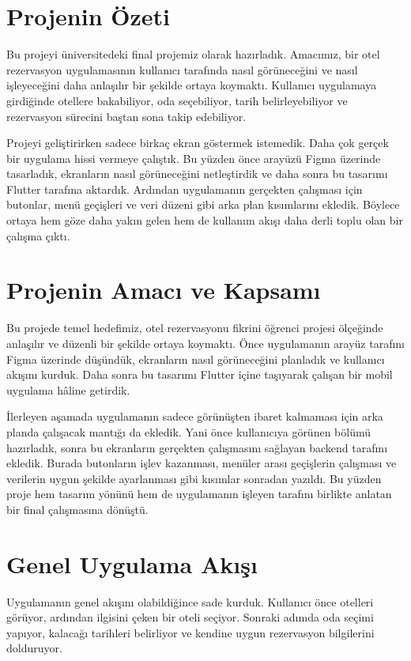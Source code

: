 \documentclass[11pt,a4paper]{article}
\begin{document}
\sloppy
\tableofcontents
\clearpage
\section{Projenin Özeti}
Bu projeyi üniversitedeki final projemiz olarak hazırladık. Amacımız, bir otel rezervasyon uygulamasının kullanıcı tarafında nasıl görüneceğini ve nasıl işleyeceğini daha anlaşılır bir şekilde ortaya koymaktı. Kullanıcı uygulamaya girdiğinde otellere bakabiliyor, oda seçebiliyor, tarih belirleyebiliyor ve rezervasyon sürecini baştan sona takip edebiliyor.

Projeyi geliştirirken sadece birkaç ekran göstermek istemedik. Daha çok gerçek bir uygulama hissi vermeye çalıştık. Bu yüzden önce arayüzü Figma üzerinde tasarladık, ekranların nasıl görüneceğini netleştirdik ve daha sonra bu tasarımı Flutter tarafına aktardık. Ardından uygulamanın gerçekten çalışması için butonlar, menü geçişleri ve veri düzeni gibi arka plan kısımlarını ekledik. Böylece ortaya hem göze daha yakın gelen hem de kullanım akışı daha derli toplu olan bir çalışma çıktı.

\section{Projenin Amacı ve Kapsamı}
Bu projede temel hedefimiz, otel rezervasyonu fikrini öğrenci projesi ölçeğinde anlaşılır ve düzenli bir şekilde ortaya koymaktı. Önce uygulamanın arayüz tarafını Figma üzerinde düşündük, ekranların nasıl görüneceğini planladık ve kullanıcı akışını kurduk. Daha sonra bu tasarımı Flutter içine taşıyarak çalışan bir mobil uygulama hâline getirdik.

İlerleyen aşamada uygulamanın sadece görünüşten ibaret kalmaması için arka planda çalışacak mantığı da ekledik. Yani önce kullanıcıya görünen bölümü hazırladık, sonra bu ekranların gerçekten çalışmasını sağlayan backend tarafını ekledik. Burada butonların işlev kazanması, menüler arası geçişlerin çalışması ve verilerin uygun şekilde ayarlanması gibi kısımlar sonradan yazıldı. Bu yüzden proje hem tasarım yönünü hem de uygulamanın işleyen tarafını birlikte anlatan bir final çalışmasına dönüştü.

\section{Genel Uygulama Akışı}
Uygulamanın genel akışını olabildiğince sade kurduk. Kullanıcı önce otelleri görüyor, ardından ilgisini çeken bir oteli seçiyor. Sonraki adımda oda seçimi yapıyor, kalacağı tarihleri belirliyor ve kendine uygun rezervasyon bilgilerini dolduruyor.
\end{document}
